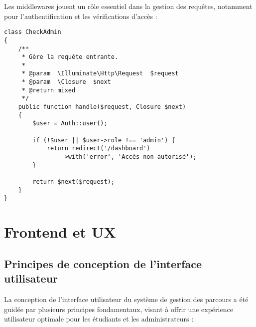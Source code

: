 \documentclass[french,12pt]{report} %
\let\oldfigure\figure
\let\endoldfigure\endfigure
\renewenvironment{figure}[1][H]{
    \oldfigure[#1]\centering
}{
    \endoldfigure
}
\begin{document}
Les middlewares jouent un rôle essentiel dans la gestion des requêtes, notamment pour l'authentification et les vérifications d'accès :

\begin{lstlisting}[style=phpstyle,caption={Middleware de vérification d'admininistration}]
class CheckAdmin
{
    /**
     * Gère la requête entrante.
     *
     * @param  \Illuminate\Http\Request  $request
     * @param  \Closure  $next
     * @return mixed
     */
    public function handle($request, Closure $next)
    {
        $user = Auth::user();
        
        if (!$user || $user->role !== 'admin') {
            return redirect('/dashboard')
                ->with('error', 'Accès non autorisé');
        }
        
        return $next($request);
    }
}
\end{lstlisting}

\section{Frontend et UX}

\subsection{Principes de conception de l'interface utilisateur}

La conception de l'interface utilisateur du système de gestion des parcours a été guidée par plusieurs principes fondamentaux, visant à offrir une expérience utilisateur optimale pour les étudiants et les administrateurs :

\begin{figure}[H]
\begin{mdframed}[style=figstyle]
\centering
{}
\end{mdframed}
\caption{Principes directeurs de la conception UX}
\label{fig:ux-principles}
\end{figure}
\end{document}
